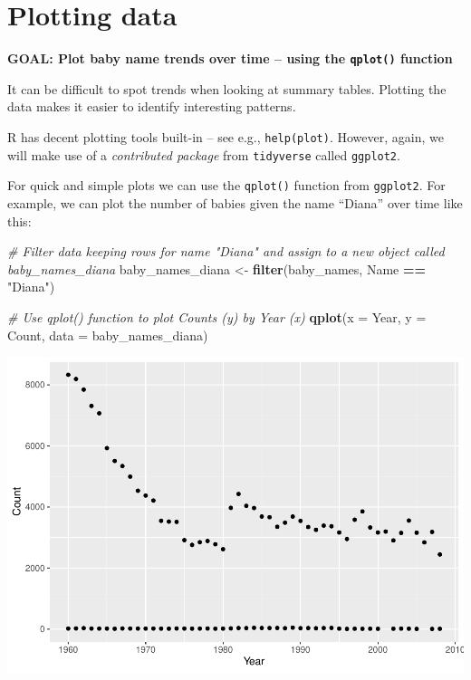 \documentclass[
]{book}
\newenvironment{Shaded}{\begin{snugshade}}{\end{snugshade}}
\newcommand{\CommentTok}[1]{\textcolor[rgb]{0.56,0.35,0.01}{\textit{#1}}}
\newcommand{\DataTypeTok}[1]{\textcolor[rgb]{0.13,0.29,0.53}{#1}}
\newcommand{\KeywordTok}[1]{\textcolor[rgb]{0.13,0.29,0.53}{\textbf{#1}}}
\newcommand{\NormalTok}[1]{#1}
\newcommand{\OperatorTok}[1]{\textcolor[rgb]{0.81,0.36,0.00}{\textbf{#1}}}
\newcommand{\StringTok}[1]{\textcolor[rgb]{0.31,0.60,0.02}{#1}}
\begin{document}
\hypertarget{plotting-data}{%
\section{Plotting data}\label{plotting-data}}

\begin{alert}

\textbf{GOAL: Plot baby name trends over time -- using the \texttt{qplot()} function}

\end{alert}

It can be difficult to spot trends when looking at summary tables. Plotting the data makes it easier to identify interesting patterns.

R has decent plotting tools built-in -- see e.g., \texttt{help(plot)}. However, again, we will make use of a \emph{contributed package} from \texttt{tidyverse} called \texttt{ggplot2}.

For quick and simple plots we can use the \texttt{qplot()} function from \texttt{ggplot2}. For example, we can plot the number of babies given the name ``Diana'' over time like this:

\begin{Shaded}
\begin{Highlighting}[]
\CommentTok{\# Filter data keeping rows for name "Diana" and assign to a new object called baby\_names\_diana}
\NormalTok{baby\_names\_diana \textless{}{-}}\StringTok{ }\KeywordTok{filter}\NormalTok{(baby\_names, Name }\OperatorTok{==}\StringTok{ "Diana"}\NormalTok{)}
\end{Highlighting}
\end{Shaded}

\begin{Shaded}
\begin{Highlighting}[]
\CommentTok{\# Use qplot() function to plot Counts (y) by Year (x)}
\KeywordTok{qplot}\NormalTok{(}\DataTypeTok{x =}\NormalTok{ Year, }\DataTypeTok{y =}\NormalTok{ Count,}
     \DataTypeTok{data =}\NormalTok{ baby\_names\_diana)}
\end{Highlighting}
\end{Shaded}

\includegraphics{R/Rintro/figures/unnamed-chunk-42-1.pdf}
\end{document}
